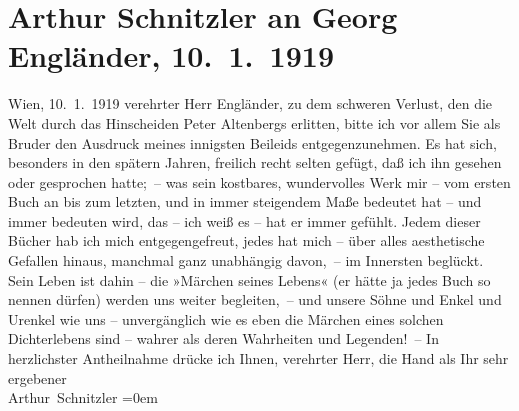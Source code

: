 

         
         \renewcommand{\erwaehntePersonen}{Personen: Peter Altenberg, Georg Engländer}
         \renewcommand{\erwaehnteOrte}{Orte: Wien}
         \renewcommand{\erwaehnteWerke}{Werke: Märchen des Lebens, Vita ipsa, Wie ich es sehe}
               \section[Arthur Schnitzler an Georg Engländer, 10. 1. 1919]{ Arthur Schnitzler an Georg Engländer, 10. 1. 1919}\nopagebreak{}\rehead{ }\begin{ledgroupsized}[t]{13cm}\normalsize\beginnumbering \toendnotes[C]{\smallbreak\pagebreak[2]} 
\toendnotes[C]{\smallbreak}\pstart
           \raggedleft{}{\pb}Wien, 10. 1. 1919\pend
           \pstart{}verehrter Herr Engländer,\pend\pstart
           zu dem schweren Verlust, den die Welt durch das Hinscheiden Peter Altenbergs erlitten, bitte ich vor allem Sie als
                    Bruder den Ausdruck meines innigsten Beileids entgegenzunehmen. Es hat sich,
                    besonders in den spätern Jahren, freilich recht selten gefügt, daß ich ihn
                    gesehen oder gesprochen hatte; – was sein kostbares, wundervolles Werk mir – vom
                    ersten Buch an bis zum letzten, und in immer
                    steigendem Maße bedeutet hat – und immer bedeuten wird, das – ich weiß es – hat
                    er immer gefühlt. Jedem dieser Bücher hab ich mich entgegengefreut, jedes hat
                    mich – über alles aesthetische Gefallen hinaus, manchmal ganz unabhängig
                    davon, – im Innersten beglückt. Sein Leben ist dahin – die »Märchen seines Lebens« (er hätte ja
                    jedes Buch so nennen dürfen) werden uns weiter begleiten, – und unsere Söhne und
                    Enkel und Urenkel wie uns – unvergänglich wie es eben die Märchen eines solchen
                    Dichterlebens sind – wahrer als deren Wahrheiten und Legenden! –\pend
           \pstart
           In herzlichster Antheilnahme drücke ich Ihnen, verehrter Herr, die Hand als
                    Ihr sehr ergebener{\\[\baselineskip]}\spacefill\mbox{Arthur Schnitzler}\pend
           \leftskip=0em{}
         

\end{ledgroupsized}
